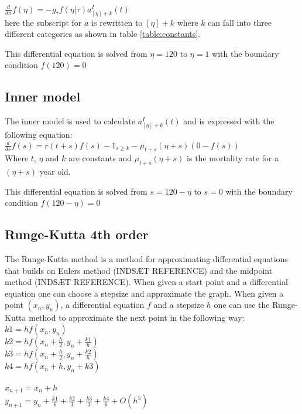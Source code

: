 $\frac{d}{dn}f(\eta) = -g_\tau f(\eta|\tau)a_{[\eta]+k}^I(t)$ \\

here the subscript for $a$ is rewritten to $[\eta]+k$ where $k$ can fall into three different categories as shown in table \ref{table:constants}. 

This differential equation is solved from $\eta = 120$ to $\eta = 1$ with the boundary condition $f(120) = 0$

\subsection{Inner model}
The inner model is used to calculate $a_{[\eta]+k}^I(t)$ and is expressed with the following equation: \\

$\frac{d}{ds}f(s) = r(t+s)f(s) - 1_{s \geq k} - \mu_{t+s}(\eta + s)(0 - f(s))$ \\

Where $t$, $\eta$ and $k$ are constants and $\mu_{t+s}(\eta + s)$ is the mortality rate for a $(\eta + s)$ year old.

This differential equation is solved from $s = 120 - \eta$ to $s = 0$ with the boundary condition $f(120 - \eta) = 0$

\subsection{Runge-Kutta 4th order}
The Runge-Kutta method is a method for approximating differential equations that builds on Eulers method (INDSÆT REFERENCE) and the midpoint method (INDSÆT REFERENCE). When given a start point and a differential equation one can choose a stepsize and approximate the graph.
When given a point $(x_n,y_n)$, a differential equation $f$ and a stepsize $h$ one can use the Runge-Kutta method to approximate the next point in the following way: \\

\noindent $k1 = h f(x_n, y_n)$ \\
$k2 = h f(x_n + \frac{h}{2}, y_n + \frac{k1}{h} )$ \\
$k3 = h f(x_n + \frac{h}{2}, y_n + \frac{k2}{h} )$ \\
$k4 = h f(x_n + h, y_n + k3 )$ \\ \\
$x_{n + 1} = x_n + h$ \\
$y_{n + 1} = y_n + \frac{k1}{6} + \frac{k2}{3} + \frac{k3}{3} + \frac{k4}{6} + O(h^5)$

